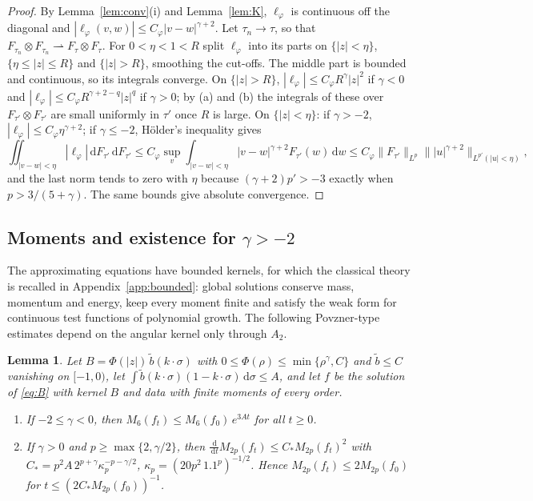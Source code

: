 \documentclass[11pt]{amsart}
\newtheorem{lemma}[theorem]{Lemma}
\theoremstyle{definition}
\newcommand{\dd}{\,\mathrm{d}}
\begin{document}
\begin{proof}
By Lemma~\ref{lem:conv}(i) and Lemma~\ref{lem:K}, $\ell_\varphi$ is continuous off the diagonal and $|\ell_\varphi(v,w)|\le C_\varphi|v-w|^{\gamma+2}$. Let $\tau_n\to\tau$, so that $F_{\tau_n}\otimes F_{\tau_n}\rightharpoonup F_\tau\otimes F_\tau$. For $0<\eta<1<R$ split $\ell_\varphi$ into its parts on $\{|z|<\eta\}$, $\{\eta\le|z|\le R\}$ and $\{|z|>R\}$, smoothing the cut-offs. The middle part is bounded and continuous, so its integrals converge. On $\{|z|>R\}$, $|\ell_\varphi|\le C_\varphi R^{\gamma}|z|^2$ if $\gamma<0$ and $|\ell_\varphi|\le C_\varphi R^{\gamma+2-q}|z|^q$ if $\gamma>0$; by (a) and (b) the integrals of these over $F_{\tau'}\otimes F_{\tau'}$ are small uniformly in $\tau'$ once $R$ is large. On $\{|z|<\eta\}$: if $\gamma>-2$, $|\ell_\varphi|\le C_\varphi\eta^{\gamma+2}$; if $\gamma\le-2$, Hölder's inequality gives
\[
\iint_{|v-w|<\eta}|\ell_\varphi|\dd F_{\tau'}\dd F_{\tau'}\le C_\varphi\sup_v\int_{|v-w|<\eta}|v-w|^{\gamma+2}F_{\tau'}(w)\dd w\le C_\varphi\|F_{\tau'}\|_{L^p}\big\||u|^{\gamma+2}\big\|_{L^{p'}(|u|<\eta)},
\]
and the last norm tends to zero with $\eta$ because $(\gamma+2)p'>-3$ exactly when $p>3/(5+\gamma)$. The same bounds give absolute convergence.
\end{proof}

\subsection{Moments and existence for \texorpdfstring{$\gamma>-2$}{gamma > -2}}
The approximating equations have bounded kernels, for which the classical theory is recalled in Appendix~\ref{app:bounded}: global solutions conserve mass, momentum and energy, keep every moment finite and satisfy the weak form for continuous test functions of polynomial growth. The following Povzner-type estimates depend on the angular kernel only through $A_2$.

\begin{lemma}\label{lem:povzner}
Let $B=\Phi(|z|)\,\tilde b(k\cdot\sigma)$ with $0\le\Phi(\rho)\le\min\{\rho^\gamma,C\}$ and $\tilde b\le C$ vanishing on $[-1,0)$, let $\int\tilde b(k\cdot\sigma)(1-k\cdot\sigma)\dd\sigma\le A$, and let $f$ be the solution of \eqref{eq:B} with kernel $B$ and data with finite moments of every order.
\begin{enumerate}
\item[(a)] If $-2\le\gamma<0$, then $M_6(f_t)\le M_6(f_0)\,e^{3At}$ for all $t\ge0$.
\item[(b)] If $\gamma>0$ and $p\ge\max\{2,\gamma/2\}$, then $\frac{\dd}{\dd t}M_{2p}(f_t)\le C_*M_{2p}(f_t)^2$ with $C_*=p^2A\,2^{p+\gamma}\kappa_p^{-p-\gamma/2}$, $\kappa_p=(20p^2\,1.1^p)^{-1/2}$. Hence $M_{2p}(f_t)\le2M_{2p}(f_0)$ for $t\le(2C_*M_{2p}(f_0))^{-1}$.
\end{enumerate}
\end{lemma}
\end{document}
